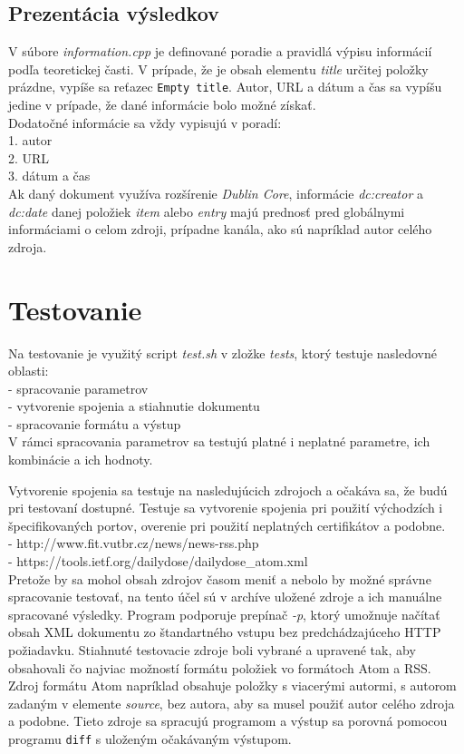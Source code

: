 \documentclass[11pt,a4paper]{article}
\begin{document}
\subsection{Prezentácia výsledkov}

V súbore \textit{information.cpp} je definované poradie a pravidlá výpisu informácií podľa teoretickej časti. V prípade, že je obsah elementu \textit{title} určitej položky prázdne, vypíše sa reťazec \texttt{Empty title}. Autor, URL a dátum a čas sa vypíšu jedine v prípade, že dané informácie bolo možné získať.\\

\noindent Dodatočné informácie sa vždy vypisujú v poradí: \\
 1. autor \\ 
 2. URL \\
 3. dátum a čas\\
 
Ak daný dokument využíva rozšírenie \textit{Dublin Core}, informácie \textit{dc:creator} a \textit{dc:date} danej položiek \textit{item} alebo \textit{entry} majú prednosť pred globálnymi informáciami o celom zdroji, prípadne kanála, ako sú napríklad autor celého zdroja.

\section{Testovanie}

Na testovanie je využitý script \textit{test.sh} v zložke \textit{tests}, ktorý testuje nasledovné oblasti:\\
 - spracovanie parametrov\\
 - vytvorenie spojenia a stiahnutie dokumentu\\
 - spracovanie formátu a výstup\\

V rámci spracovania parametrov sa testujú platné i neplatné parametre, ich kombinácie a ich hodnoty.

\noindent Vytvorenie spojenia sa testuje na nasledujúcich zdrojoch a očakáva sa, že budú pri testovaní dostupné. Testuje sa vytvorenie spojenia pri použití východzích i špecifikovaných portov, overenie pri použití neplatných certifikátov a podobne.\\
- http://www.fit.vutbr.cz/news/news-rss.php\\
- https://tools.ietf.org/dailydose/dailydose\_atom.xml\\



Pretože by sa mohol obsah zdrojov časom meniť a nebolo by možné správne spracovanie testovať, na tento účel sú v archíve uložené zdroje a ich manuálne spracované výsledky. Program podporuje prepínač \textit{-p}, ktorý umožnuje načítať obsah XML dokumentu zo štandartného vstupu bez predchádzajúceho HTTP požiadavku. Stiahnuté testovacie zdroje boli vybrané a upravené tak, aby obsahovali čo najviac možností formátu položiek vo formátoch Atom a RSS. Zdroj formátu Atom napríklad obsahuje položky s viacerými autormi, s autorom zadaným v elemente \textit{source}, bez autora, aby sa musel použiť autor celého zdroja a podobne. Tieto zdroje sa spracujú programom a výstup sa porovná pomocou programu \texttt{diff} s uloženým očakávaným výstupom.
\end{document}
